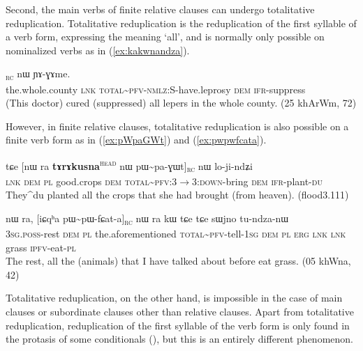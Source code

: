 \documentclass[oldfontcommands,oneside,a4paper,11pt]{article}
\newcommand{\ipa}[1]{{\phon #1}} %
\newcommand{\topic}{\textsc{dem}}
\newcommand{\tete}{\textsuperscript{\textsc{head}}}
\newcommand{\rc}{\textsubscript{\textsc{rc}}}
\newcommand{\refb}[1]{(\ref{#1})}
\begin{document}
Second, the main verbs of finite relative clauses can undergo totalitative reduplication. Totalitative reduplication is the  reduplication of the first syllable of a verb form, expressing the meaning `all', and is normally only possible on nominalized verbs as in \refb{ex:kakwnandza}.

\begin{exe}
   \ex  \label{ex:kakwnandza}
\gll [<quanxian>  	\ipa{tɕe}  	\ipa{kɯ\textasciitilde{}kɤ-kɯ-nɤndza}]\rc{}  	\ipa{nɯ}  	\ipa{ɲɤ-ɣɤme.}      	\\
the.whole.county \textsc{lnk}  \textsc{total\textasciitilde{}pfv-nmlz:S}-have.leprosy \topic{} \textsc{ifr}-suppress \\
 \glt  (This doctor) cured (suppressed) all lepers in the whole county. (25 khArWm, 72)
   \end{exe} 


However, in finite relative clauses, totalitative reduplication is also possible on a finite verb form as in \refb{ex:pWpaGWt} and \refb{ex:pwpwfcata}.

  \begin{exe}
\ex \label{ex:pWpaGWt}
\gll
\ipa{tɕe}  	[\ipa{nɯ} \ipa{ra}  	\textbf{\ipa{tɤrɤkusna}}\tete{}  	\ipa{nɯ}  	\ipa{pɯ\textasciitilde{}pa-ɣɯt}]\rc{}  	\ipa{nɯ}  	\ipa{lo-ji-ndʑi}  \\
\textsc{lnk} \textsc{dem} \textsc{pl} good.crops \topic{} \textsc{total\textasciitilde{}pfv:3$\rightarrow$3:down}-bring \topic{} \textsc{ifr}-plant-\textsc{du} \\
\glt They^{du} planted all the crops that she had brought (from heaven). (flood3.111)
\end{exe}

  \begin{exe}
   \ex \label{ex:pwpwfcata}
 \gll \ipa{ɯ-ro}   	\ipa{nɯ} \ipa{ra,}   	[\ipa{iɕqʰa}   	\ipa{pɯ\textasciitilde{}pɯ-fɕat-a}]\rc{}   	\ipa{nɯ} \ipa{ra}  	\ipa{kɯ}   	\ipa{tɕe}   	\ipa{tɕe}   	\ipa{sɯjno}   	\ipa{tu-ndza-nɯ}    \\
 \textsc{3sg.poss}-rest \topic{} \textsc{pl} the.aforementioned \textsc{total\textasciitilde{}pfv}-tell-\textsc{1sg} \topic{} \textsc{pl} \textsc{erg} \textsc{lnk} \textsc{lnk} grass \textsc{ipfv}-eat-\textsc{pl} \\
\glt The rest, all the (animals) that I have talked about before eat grass. (05 khWna, 42)
\end{exe}


Totalitative reduplication, on the other hand, is impossible in the case of main clauses or subordinate clauses other than relative clauses. Apart from totalitative reduplication, reduplication of the first syllable of the verb form is only found in the protasis of some conditionals (\citealt{jacques14linking}), but this is an entirely different phenomenon.
\end{document}
